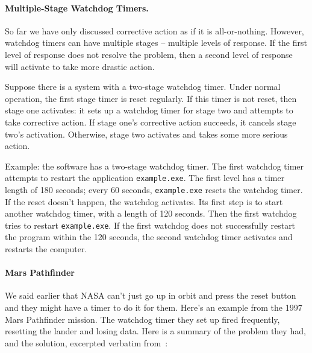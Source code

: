 \paragraph{Multiple-Stage Watchdog Timers.}
So far we have only discussed corrective action as if it is all-or-nothing. However, watchdog timers can have multiple stages -- multiple levels of response. If the first level of response does not resolve the problem, then a second level of response will activate to take more drastic action. 

Suppose there is a system with a two-stage watchdog timer. Under normal operation, the first stage timer is reset regularly. If this timer is not reset, then stage one activates: it sets up a watchdog timer for stage two and attempts to take corrective action. If stage one's corrective action succeeds, it cancels stage two's activation. Otherwise, stage two activates and takes some more serious action.

Example: the software has a two-stage watchdog timer. The first watchdog timer attempts to restart the application \texttt{example.exe}. The first level has a timer length of 180 seconds; every 60 seconds, \texttt{example.exe} resets the watchdog timer. If the reset doesn't happen, the watchdog activates. Its first step is to start another watchdog timer, with a length of 120 seconds. Then the first watchdog tries to restart \texttt{example.exe}. If the first watchdog does not successfully restart the program within the 120 seconds, the second watchdog timer activates and restarts the computer.


\paragraph{Mars Pathfinder}
We said earlier that NASA can't just go up in orbit and press the reset button and they might have a timer to do it for them. Here's an example from the 1997 Mars Pathfinder mission. The watchdog timer they set up fired frequently, resetting the lander and losing data. Here is a summary of the problem they had, and the solution, excerpted verbatim from~\cite{pathfinder}:

